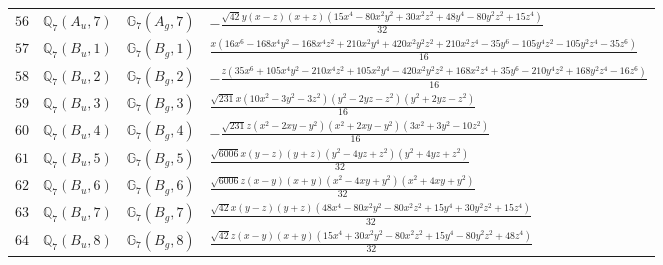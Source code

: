 \documentclass[fleqn,8pt,landscape]{jsarticle}
\begin{document}
\begin{table}[ht!]
\begin{center}
\begin{tabular}{cccl}
$ 56 $ & $ \mathbb{Q}_{7}(A_{u},7) $ & $ \mathbb{G}_{7}(A_{g},7) $ & $ - \frac{\sqrt{42} y \left(x - z\right) \left(x + z\right) \left(15 x^{4} - 80 x^{2} y^{2} + 30 x^{2} z^{2} + 48 y^{4} - 80 y^{2} z^{2} + 15 z^{4}\right)}{32} $ \\
$ 57 $ & $ \mathbb{Q}_{7}(B_{u},1) $ & $ \mathbb{G}_{7}(B_{g},1) $ & $ \frac{x \left(16 x^{6} - 168 x^{4} y^{2} - 168 x^{4} z^{2} + 210 x^{2} y^{4} + 420 x^{2} y^{2} z^{2} + 210 x^{2} z^{4} - 35 y^{6} - 105 y^{4} z^{2} - 105 y^{2} z^{4} - 35 z^{6}\right)}{16} $ \\
$ 58 $ & $ \mathbb{Q}_{7}(B_{u},2) $ & $ \mathbb{G}_{7}(B_{g},2) $ & $ - \frac{z \left(35 x^{6} + 105 x^{4} y^{2} - 210 x^{4} z^{2} + 105 x^{2} y^{4} - 420 x^{2} y^{2} z^{2} + 168 x^{2} z^{4} + 35 y^{6} - 210 y^{4} z^{2} + 168 y^{2} z^{4} - 16 z^{6}\right)}{16} $ \\
$ 59 $ & $ \mathbb{Q}_{7}(B_{u},3) $ & $ \mathbb{G}_{7}(B_{g},3) $ & $ \frac{\sqrt{231} x \left(10 x^{2} - 3 y^{2} - 3 z^{2}\right) \left(y^{2} - 2 y z - z^{2}\right) \left(y^{2} + 2 y z - z^{2}\right)}{16} $ \\
$ 60 $ & $ \mathbb{Q}_{7}(B_{u},4) $ & $ \mathbb{G}_{7}(B_{g},4) $ & $ - \frac{\sqrt{231} z \left(x^{2} - 2 x y - y^{2}\right) \left(x^{2} + 2 x y - y^{2}\right) \left(3 x^{2} + 3 y^{2} - 10 z^{2}\right)}{16} $ \\
$ 61 $ & $ \mathbb{Q}_{7}(B_{u},5) $ & $ \mathbb{G}_{7}(B_{g},5) $ & $ \frac{\sqrt{6006} x \left(y - z\right) \left(y + z\right) \left(y^{2} - 4 y z + z^{2}\right) \left(y^{2} + 4 y z + z^{2}\right)}{32} $ \\
$ 62 $ & $ \mathbb{Q}_{7}(B_{u},6) $ & $ \mathbb{G}_{7}(B_{g},6) $ & $ \frac{\sqrt{6006} z \left(x - y\right) \left(x + y\right) \left(x^{2} - 4 x y + y^{2}\right) \left(x^{2} + 4 x y + y^{2}\right)}{32} $ \\
$ 63 $ & $ \mathbb{Q}_{7}(B_{u},7) $ & $ \mathbb{G}_{7}(B_{g},7) $ & $ \frac{\sqrt{42} x \left(y - z\right) \left(y + z\right) \left(48 x^{4} - 80 x^{2} y^{2} - 80 x^{2} z^{2} + 15 y^{4} + 30 y^{2} z^{2} + 15 z^{4}\right)}{32} $ \\
$ 64 $ & $ \mathbb{Q}_{7}(B_{u},8) $ & $ \mathbb{G}_{7}(B_{g},8) $ & $ \frac{\sqrt{42} z \left(x - y\right) \left(x + y\right) \left(15 x^{4} + 30 x^{2} y^{2} - 80 x^{2} z^{2} + 15 y^{4} - 80 y^{2} z^{2} + 48 z^{4}\right)}{32} $ \\
 \hline \hline
\end{tabular}
\end{center}
\end{table}
\end{document}

